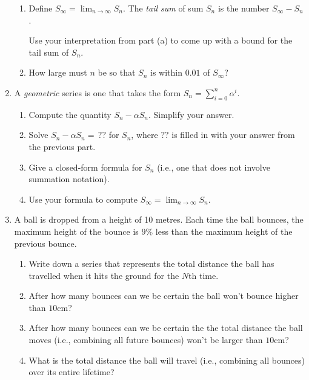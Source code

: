 \begin{enumerate}
\begin{enumerate}
            \item Define $S_\infty=\lim_{n\to\infty}S_n$. The \emph{tail sum} of sum $S_n$
			is the number $S_\infty - S_n$. 

			Use your interpretation from part (a) to come up with a bound for the tail sum of $S_n$.

            \item How large must $n$ be so that $S_n$ is within $0.01$ of $S_\infty$?
		\end{enumerate}

		\item A \emph{geometric} series is one that takes the form $\displaystyle S_n=\sum_{i=0}^n \alpha^i$.
		\begin{enumerate}
			\item Compute the quantity $S_n-\alpha S_n$. Simplify your answer.
			\item Solve $S_n-\alpha S_n=\,??$ for $S_n$, where $??$ is filled in with your answer from the previous part. 
			\item Give a closed-form formula for $S_n$ (i.e., one that does not involve summation notation).
			\item Use your formula to compute $S_\infty =\lim_{n\to\infty} S_n$.
		\end{enumerate}

        \item A ball is dropped from a height of 10 metres. Each time the ball bounces, the maximum height of the bounce is $9$\% less than the maximum height of the previous bounce. 
        
        \begin{enumerate}
            \item Write down a series that represents the total distance the ball has travelled when it hits the ground for the $N$th time. 
            \item After how many bounces can we be certain the ball won't bounce higher than $10$cm?
            \item After how many bounces can we be certain the the total distance the ball moves (i.e., combining all future bounces) won't be larger than $10$cm?
            \item What is the total distance the ball will travel (i.e., combining all bounces)
			over its entire lifetime?
        \end{enumerate}

\end{enumerate}